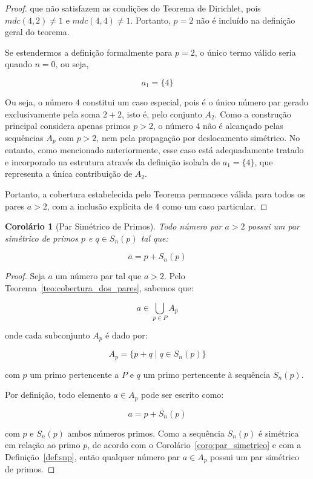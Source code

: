 \documentclass[a4paper,11pt]{article}
\newtheorem{corollary}[theorem]{Corolário}
\theoremstyle{definition}
\theoremstyle{remark}
\begin{document}
\begin{otherlanguage}{brazil}
\begin{proof}
		que não satisfazem as condições do Teorema de Dirichlet, pois \(mdc(4,2) \neq 1\) e \(mdc(4,4) \neq 1\). Portanto, \(p = 2\) não é incluído na definição geral do teorema.
		
		Se estendermos a definição formalmente para \(p = 2\), o único termo válido seria quando \(n = 0\), ou seja,
		
		\[
		a_1 = \{4\}
		\]
		
		Ou seja, o número \(4\) constitui um caso especial, pois é o único número par gerado exclusivamente pela soma \(2 + 2\), isto é, pelo conjunto \(A_2\). Como a construção principal considera apenas primos \(p > 2\), o número \(4\) não é alcançado pelas sequências \(A_p\) com \(p > 2\), nem pela propagação por deslocamento simétrico. No entanto, como mencionado anteriormente, esse caso está adequadamente tratado e incorporado na estrutura através da definição isolada de \(a_1 = \{4\}\), que representa a única contribuição de \(A_2\).
		
		Portanto, a cobertura estabelecida pelo Teorema permanece válida para todos os pares \(a > 2\), com a inclusão explícita de \(4\) como um caso particular.
		
	\end{proof}
	

	\begin{corollary}[Par Simétrico de Primos]\label{coro:par_simetrico_primos}
		Todo número par \(a > 2\) possui um par simétrico de primos \(p\) e \(q \in S_n(p)\) tal que:
		
		\[
		a = p + S_n(p)
		\]
	\end{corollary}
	
	\begin{proof}
		Seja \(a\) um número par tal que \(a > 2\). Pelo Teorema~\ref{teo:cobertura_dos_pares}, sabemos que:
		
		\[
		a \in \bigcup_{p \in P} A_p
		\]
		
		onde cada subconjunto \(A_p\) é dado por:
		
		\[
		A_p = \{p + q \mid q \in S_n(p)\}
		\]
		
		com \(p\) um primo pertencente a \(P\) e \(q\) um primo pertencente à sequência \(S_n(p)\).
		
		Por definição, todo elemento \(a \in A_p\) pode ser escrito como:
		
		\[
		a = p + S_n(p)
		\]
		
		com \(p\) e \(S_n(p)\) ambos números primos. Como a sequência \(S_n(p)\) é simétrica em relação ao primo \(p\), de acordo com o Corolário~\ref{coro:par_simetrico} e com a Definição~\ref{def:snp}, então qualquer número par \(a \in A_p\) possui um par simétrico de primos.
		

\end{proof}
\end{otherlanguage}
\end{document}
